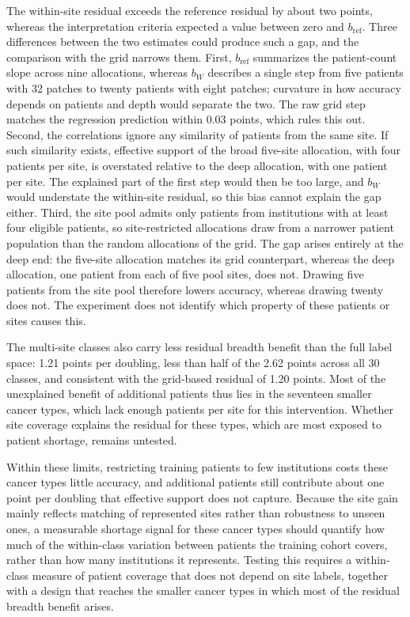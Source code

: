 The within-site residual exceeds the reference residual by about two points, whereas the interpretation criteria expected a value between zero and $b_{\mathrm{ref}}$. Three differences between the two estimates could produce such a gap, and the comparison with the grid narrows them. First, $b_{\mathrm{ref}}$ summarizes the patient-count slope across nine allocations, whereas $b_W$ describes a single step from five patients with 32 patches to twenty patients with eight patches; curvature in how accuracy depends on patients and depth would separate the two. The raw grid step matches the regression prediction within 0.03 points, which rules this out. Second, the correlations ignore any similarity of patients from the same site. If such similarity exists, effective support of the broad five-site allocation, with four patients per site, is overstated relative to the deep allocation, with one patient per site. The explained part of the first step would then be too large, and $b_W$ would understate the within-site residual, so this bias cannot explain the gap either. Third, the site pool admits only patients from institutions with at least four eligible patients, so site-restricted allocations draw from a narrower patient population than the random allocations of the grid. The gap arises entirely at the deep end: the five-site allocation matches its grid counterpart, whereas the deep allocation, one patient from each of five pool sites, does not. Drawing five patients from the site pool therefore lowers accuracy, whereas drawing twenty does not. The experiment does not identify which property of these patients or sites causes this.

The multi-site classes also carry less residual breadth benefit than the full label space: 1.21 points per doubling, less than half of the 2.62 points across all 30 classes, and consistent with the grid-based residual of 1.20 points. Most of the unexplained benefit of additional patients thus lies in the seventeen smaller cancer types, which lack enough patients per site for this intervention. Whether site coverage explains the residual for these types, which are most exposed to patient shortage, remains untested.

Within these limits, restricting training patients to few institutions costs these cancer types little accuracy, and additional patients still contribute about one point per doubling that effective support does not capture. Because the site gain mainly reflects matching of represented sites rather than robustness to unseen ones, a measurable shortage signal for these cancer types should quantify how much of the within-class variation between patients the training cohort covers, rather than how many institutions it represents. Testing this requires a within-class measure of patient coverage that does not depend on site labels, together with a design that reaches the smaller cancer types in which most of the residual breadth benefit arises.
